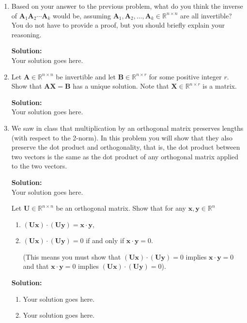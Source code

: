 \documentclass[]{article}
\newcommand{\R}{\mathbb{R}}				%
\newcommand{\x}{\bm{x}}					%
\newcommand{\y}{\bm{y}}					%
\newcommand{\A}{\bm{A}}					%
\newcommand{\solution}{\vskip 0.5cm \textbf{\large Solution:} \\}
\begin{document}
\begin{enumerate}
	\solution
	Your solution goes here.


	\item Based on your answer to the previous problem, what do you think the inverse of $\A_1\A_2\cdots \A_k$ would be, assuming $\A_1,\A_2,\dots,\A_k\in\R^{n\times n}$ are all invertible? You do not have to provide a proof, but you should briefly explain your reasoning.

	\solution
	Your solution goes here.


	\item Let $\A\in\R^{n\times n}$ be invertible and let $\bm{B}\in\R^{n\times r}$ for some positive integer $r$. Show that $\bm{AX}=\bm{B}$ has a unique solution. Note that $\bm{X}\in\R^{n\times r}$ is a matrix.

	\solution
	Your solution goes here.


	\item We saw in class that multiplication by an orthogonal matrix preserves lengths (with respect to the 2-norm). In this problem you will show that they also preserve the dot product and orthogonality, that is, the dot product between two vectors is the same as the dot product of any orthogonal matrix applied to the two vectors.

	\solution
	Your solution goes here.

	Let $\bm{U}\in\R^{n\times n}$ be an orthogonal matrix. Show that for any $\x,\y\in\R^n$
	\begin{enumerate}
		\item $(\bm{Ux})\cdot(\bm{Uy})=\x\cdot\y$,
		\item $(\bm{Ux})\cdot(\bm{Uy}) = 0$ if and only if $\x\cdot \y=0$.

		(This means you must show that $(\bm{Ux})\cdot(\bm{Uy}) = 0$ implies $\x\cdot \y=0$ and that $\x\cdot \y=0$ implies $(\bm{Ux})\cdot(\bm{Uy}) = 0$).
	\end{enumerate}

	\solution
	\begin{enumerate}
		\item Your solution goes here.
		\item Your solution goes here. 
	\end{enumerate}
\end{enumerate}
\end{document}
